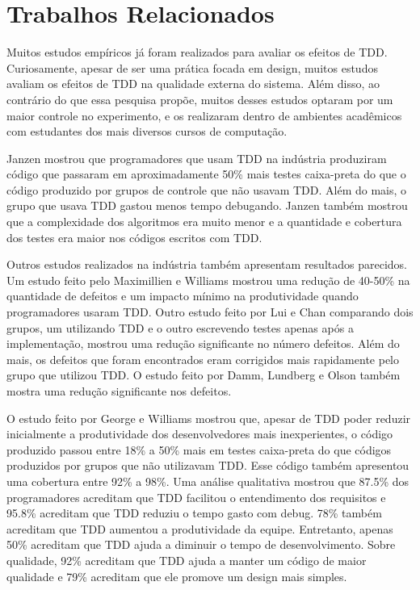 \chapter{Trabalhos Relacionados}
\label{cap:trabalhos-relacionados}

Muitos estudos empíricos já foram realizados para avaliar os efeitos de TDD.
Curiosamente, apesar de ser uma prática focada em design, muitos estudos avaliam
os efeitos de TDD na qualidade externa do sistema. Além disso, ao
contrário do que essa pesquisa propõe, muitos desses estudos optaram por um
maior controle no experimento, e os realizaram dentro de ambientes acadêmicos 
com estudantes dos mais diversos cursos de computação.

Janzen \cite{janzen-arch-improvement} mostrou que programadores que usam TDD na 
indústria produziram código que passaram em aproximadamente 50\% mais testes 
caixa-preta do que o código produzido por grupos de controle que não usavam TDD.
Além do mais, o grupo que usava TDD gastou menos tempo debugando. Janzen também 
mostrou que a complexidade dos algoritmos era muito menor e a quantidade e
cobertura dos testes era maior nos códigos escritos com TDD.

Outros estudos realizados na indústria também apresentam resultados parecidos.
Um estudo feito pelo Maximillien e Williams \cite{max-e-williams} mostrou uma
redução de 40-50\% na quantidade de defeitos e um impacto mínimo na
produtividade quando programadores usaram TDD. Outro estudo feito por Lui e
Chan \cite{lui-e-chan} comparando dois grupos, um utilizando TDD e o outro 
escrevendo testes apenas após a implementação, mostrou uma redução significante 
no número defeitos. Além do mais, os defeitos que foram encontrados eram 
corrigidos mais rapidamente pelo grupo que utilizou TDD. O estudo feito por 
Damm, Lundberg e Olson \cite{damn-lundberg-e-olson} também mostra uma redução
significante nos defeitos.

O estudo feito por George e Williams \cite{george-e-williams} mostrou que,
apesar de TDD poder reduzir inicialmente a produtividade dos desenvolvedores 
mais inexperientes, o código produzido passou entre 18\% a 50\% mais em testes 
caixa-preta do que códigos produzidos por grupos que não utilizavam TDD. Esse
código também apresentou uma cobertura entre 92\% a 98\%. Uma análise
qualitativa mostrou que 87.5\% dos programadores acreditam que TDD facilitou o 
entendimento dos requisitos e 95.8\% acreditam que TDD reduziu o tempo gasto com
debug. 78\% também acreditam que TDD aumentou a produtividade da equipe. 
Entretanto, apenas 50\% acreditam que TDD ajuda a diminuir o tempo de 
desenvolvimento. Sobre qualidade, 92\% acreditam que TDD ajuda a manter um
código de maior qualidade e 79\% acreditam que ele promove um design mais simples.

